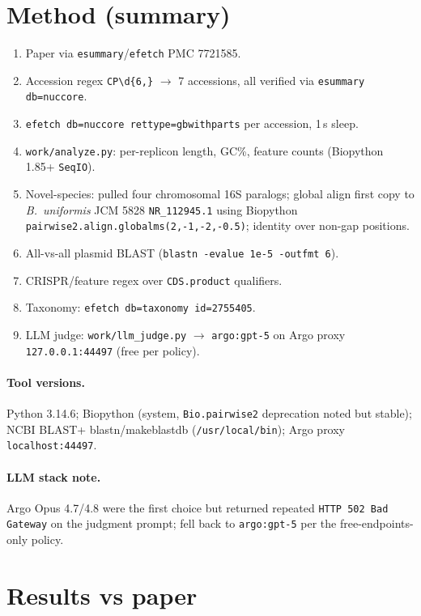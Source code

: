 \documentclass[11pt,letterpaper]{article}
\begin{document}
\section{Method (summary)}
\begin{enumerate}[leftmargin=1.2em,itemsep=1pt]
  \item Paper via \texttt{esummary}/\texttt{efetch} PMC 7721585.
  \item Accession regex \texttt{CP\textbackslash d\{6,\}} $\rightarrow$ 7 accessions, all verified via \texttt{esummary db=nuccore}.
  \item \texttt{efetch db=nuccore rettype=gbwithparts} per accession, 1\,s sleep.
  \item \texttt{work/analyze.py}: per-replicon length, GC\%, feature counts (Biopython 1.85+ \texttt{SeqIO}).
  \item Novel-species: pulled four chromosomal 16S paralogs; global align first copy to \textit{B.~uniformis} JCM 5828 \texttt{NR\_112945.1} using Biopython \texttt{pairwise2.align.globalms(2,-1,-2,-0.5)}; identity over non-gap positions.
  \item All-vs-all plasmid BLAST (\texttt{blastn -evalue 1e-5 -outfmt 6}).
  \item CRISPR/feature regex over \texttt{CDS.product} qualifiers.
  \item Taxonomy: \texttt{efetch db=taxonomy id=2755405}.
  \item LLM judge: \texttt{work/llm\_judge.py} $\rightarrow$ \texttt{argo:gpt-5} on Argo proxy \texttt{127.0.0.1:44497} (free per policy).
\end{enumerate}

\paragraph{Tool versions.} Python 3.14.6; Biopython (system, \texttt{Bio.pairwise2} deprecation noted but stable); NCBI BLAST+ blastn/makeblastdb (\texttt{/usr/local/bin}); Argo proxy \texttt{localhost:44497}.

\paragraph{LLM stack note.} Argo Opus 4.7/4.8 were the first choice but returned repeated \texttt{HTTP 502 Bad Gateway} on the judgment prompt; fell back to \texttt{argo:gpt-5} per the free-endpoints-only policy.

\section{Results vs paper}
\end{document}
